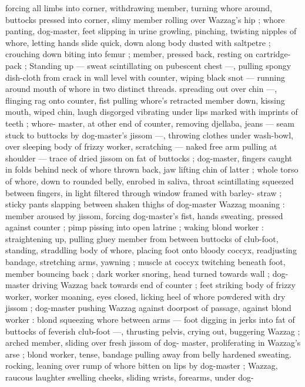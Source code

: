{forcing all limbs into corner, withdrawing member, turning whore 
around, buttocks pressed into corner, slimy member rolling over 
Wazzag's hip ; whore panting, dog-master, feet slipping in urine 
growling, pinching, twisting nipples of whore, letting hands slide 
quick, down along body dusted with saltpetre ; crouching down 
biting into femur ; member, pressed back, resting on cartridge-pack 
; Standing up --- sweat scintillating on pubescent chest ---, pulling 
spongy dish-cloth from crack in wall level with counter, wiping black 
snot --- running around mouth of whore in two distinct threads. 
spreading out over chin ---, flinging rag onto counter, fist pulling 
whore's retracted member down, kissing mouth, wiped chin, laugh 
disgorged vibrating under lips marked with imprints of teeth ; whore- 
master, at other end of counter, removing djellaba, jeans --- seam 
stuck to buttocks by dog-master's jissom ---, throwing clothes under 
wash-bowl, over sleeping body of frizzy worker, scratching --- naked 
free arm pulling at shoulder --- trace of dried jissom on fat of 
buttocks ; dog-master, fingers caught in folds behind neck of whore 
thrown back, jaw lifting chin of latter ; whole torso of whore, down to 
rounded belly, enrobed in saliva, throat scintillating squeezed 
between fingers, in light filtered through window framed with barley- 
straw ; sticky pants slapping between shaken thighs of dog-master 
Wazzag moaning : member aroused by jissom, forcing dog-master's 
fist, hands sweating, pressed against counter ; pimp pissing into 
open latrine ; waking blond worker : straightening up, pulling gluey 
member from between buttocks of club-foot, standing, straddling 
body of whore, placing foot onto bloody coccyx, readjusting 
bandage, stretching arms, yawning ; muscle at coccyx twitching 
beneath foot, member bouncing back ; dark worker snoring, head 
turned towards wall ; dog-master driving Wazzag back towards end 
of counter ; feet striking body of frizzy worker, worker moaning, eyes 
closed, licking heel of whore powdered with dry jissom ; dog-master 
pushing Wazzag against doorpost of passage, against blond worker 
: blond squeezing whore between arms --- foot digging in jerks into 
fat of buttocks of feverish club-foot ---, thrusting pelvis, crying out, 
buggering Wazzag ; arched member, sliding over fresh jissom of dog- 
master, proliferating in Wazzag's arse ; blond worker, tense, bandage 
pulling away from belly hardened sweating. rocking, leaning over 
rump of whore bitten on lips by dog-master ; Wazzag, raucous 
laughter swelling cheeks, sliding wrists, forearms, under dog- 
}

